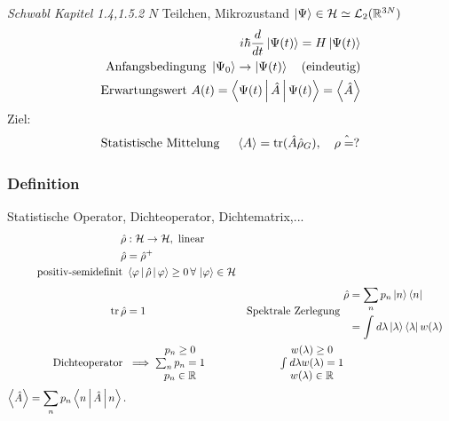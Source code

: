 \documentclass[11pt]{article}
\theoremstyle{plain}
\newcommand{\R}{\mathbb{R}}
\newcommand{\trace}{\operatorname{tr}}
\begin{document}
\emph{Schwabl Kapitel 1.4,1.5.2}
$N $ Teilchen, Mikrozustand $\Ket{\Psi} \in \mathcal{H} \simeq \mathcal{L}_2(\R^{3N})$
\begin{align*}
  i \hbar \frac{d}{dt} \Ket{\Psi(t)} = H \Ket{\Psi(t)} \\
  \text{Anfangsbedingung } \Ket{\Psi_0} \to \Ket{\Psi(t)} \quad \text{(eindeutig)} \\
  \text{Erwartungswert } A(t)= \Braket{\Psi(t) | \hat{A} | \Psi(t)} =\Braket{\hat{A}} \\
\end{align*}
Ziel: \[ \text{Statistische Mittelung } \quad \Braket{A} = \trace(\hat{A}\hat{\rho}_G), \quad \hat{\rho=?} \] 
\subsubsection*{Definition}
Statistische Operator, Dichteoperator, Dichtematrix,...
\begin{align*}
  \hat{\rho} & : \mathcal{H} \to  \mathcal{H}, \text{ linear } \\
  \hat{\rho} & = \hat{\rho}^+ \\
  \text{positiv-semidefinit } & \Braket{\varphi | \hat{\rho}| \varphi} \ge 0 \,\forall\,\Ket{\varphi} \in \mathcal{ H} \\
  \trace \hat{\rho } & =1  &
  \text{Spektrale Zerlegung } & \begin{split}
  \hat{\rho} &=  \sum_{n}^{} p_n \Ket{n}\Bra{n} \\ &= \int_{}^{} d \lambda \Ket{\lambda}\Bra{\lambda} w(\lambda) 
  \end{split}
   \\
  \text{Dichteoperator } & \implies \begin{matrix} p_n \ge 0 \\ \sum_{n}^{} p_n =1 \\
p_n \in \R \end{matrix} 
&
\begin{matrix} 
  w(\lambda )\ge 0 \\ \int_{}^{} d \lambda w( \lambda )=1 \\ w(\lambda) \in \R 
\end{matrix} \\
  \Braket{\hat{A}}= \sum_{n}^{}p_n \Braket{n|\hat{A}|n}.
\end{align*}
\end{document}
